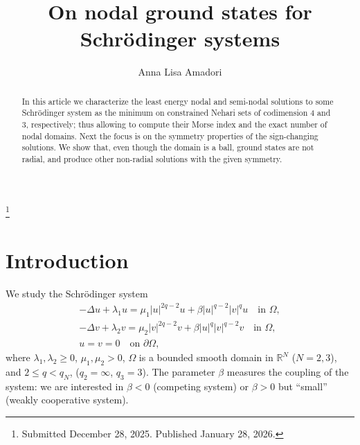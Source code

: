 \documentclass[reqno]{amsart}
\begin{document}
\title[\hfilneg EJDE-2026/08\hfil
Ground states for Schr\"odinger systems]
{On nodal ground states for Schr\"odinger systems}

\author[A. L. Amadori \hfil EJDE-2026/08\hfilneg]
{Anna Lisa Amadori}

\address{Anna Lisa Amadori \newline
Dipartimento di Scienze e Tecnologie,
Universit\`a di Napoli ``Parthenope'',
Centro Direzionale di Napoli,
Isola C4, 80143 Napoli, Italy}


\thanks{Submitted December 28, 2025. Published January 28, 2026.}

\begin{abstract}
In this article we characterize the least energy nodal and semi-nodal solutions
to some  Schr\"{o}dinger system  as the  minimum on constrained Nehari sets of
codimension 4 and 3, respectively;
thus allowing to compute their Morse index and the exact number of nodal domains.
Next the focus is on the symmetry properties of the sign-changing solutions.
We show that, even though the domain is a ball, ground states are not radial,
and produce other non-radial solutions with the given symmetry.
\end{abstract}

\maketitle
{}
\newtheorem{theorem}{Theorem}[section]
\newtheorem{lemma}[theorem]{Lemma}
\newtheorem{corollary}[theorem]{Corollary}
\newtheorem{proposition}[theorem]{Proposition}
\allowdisplaybreaks

\section{Introduction}

We study the Schr\"odinger system
\begin{equation}\label{S}
 \begin{gathered}
 -\Delta u +\lambda_1 u= \mu_1 |u|^{2q-2} u +\beta |u|^{q-2}|v|^q u \quad
  \text{in } \Omega , \\
 -\Delta v +\lambda_2 v= \mu_2 |v|^{2q-2} v +\beta |u|^{q}|v|^{q-2} v \quad
  \text{in } \Omega ,\\
  u=v=0 \quad \text{on } \partial\Omega,
 \end{gathered}
\end{equation}
where $\lambda_1,\lambda_2\ge 0$, $\mu_1,\mu_2>0$, $\Omega$ is a bounded smooth domain
in $\mathbb{R}^N$ ($N=2,3$), and  $2\le q<q_N$, ($q_2=\infty$, $q_3=3$).
The parameter $\beta$ measures the coupling of the system: we are interested in
$\beta<0$ (competing system) or $\beta >0$ but ``small''
 (weakly cooperative system).
\end{document}
